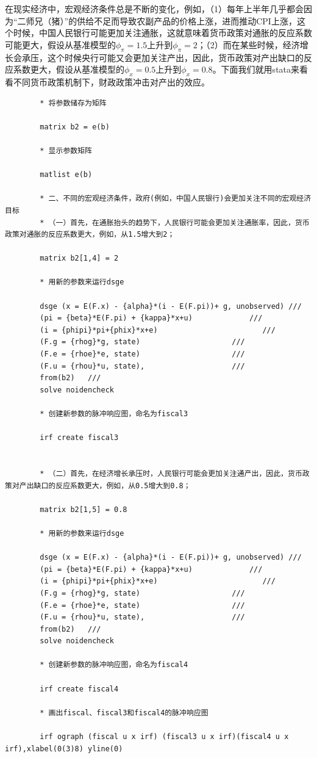 \documentclass[cn,12pt,math=newtx,citestyle=gb7714-2015,bibstyle=gb7714-2015]{elegantbook}
\begin{document}
	在现实经济中，宏观经济条件总是不断的变化，例如，（1）每年上半年几乎都会因为“二师兄（猪）”的供给不足而导致农副产品的价格上涨，进而推动CPI上涨，这个时候，中国人民银行可能更加关注通胀，这就意味着货币政策对通胀的反应系数可能更大，假设从基准模型的$\phi_\pi= 1.5$上升到$\phi_\pi= 2$；（2）而在某些时候，经济增长会承压，这个时候央行可能又会更加关注产出，因此，货币政策对产出缺口的反应系数更大，假设从基准模型的$\phi_x= 0.5$上升到$\phi_x= 0.8$。下面我们就用stata来看看不同货币政策机制下，财政政策冲击对产出的效应。
	
	\begin{lstlisting}
		* 将参数储存为矩阵
		
		matrix b2 = e(b)
		
		* 显示参数矩阵
		
		matlist e(b)
		
		* 二、不同的宏观经济条件，政府(例如，中国人民银行)会更加关注不同的宏观经济目标
		* （一）首先，在通胀抬头的趋势下，人民银行可能会更加关注通胀率，因此，货币政策对通胀的反应系数更大，例如，从1.5增大到2；
		
		matrix b2[1,4] = 2
		
		* 用新的参数来运行dsge
		
		dsge (x = E(F.x) - {alpha}*(i - E(F.pi))+ g, unobserved) ///
		(pi = {beta}*E(F.pi) + {kappa}*x+u)             ///
		(i = {phipi}*pi+{phix}*x+e)                        ///
		(F.g = {rhog}*g, state)                     ///
		(F.e = {rhoe}*e, state)                     ///
		(F.u = {rhou}*u, state),                    ///
		from(b2)   /// 
		solve noidencheck
		
		* 创建新参数的脉冲响应图，命名为fiscal3
		
		irf create fiscal3
		
		
		* （二）首先，在经济增长承压时，人民银行可能会更加关注通产出，因此，货币政策对产出缺口的反应系数更大，例如，从0.5增大到0.8；
		
		matrix b2[1,5] = 0.8
		
		* 用新的参数来运行dsge
		
		dsge (x = E(F.x) - {alpha}*(i - E(F.pi))+ g, unobserved) ///
		(pi = {beta}*E(F.pi) + {kappa}*x+u)             ///
		(i = {phipi}*pi+{phix}*x+e)                        ///
		(F.g = {rhog}*g, state)                     ///
		(F.e = {rhoe}*e, state)                     ///
		(F.u = {rhou}*u, state),                    ///
		from(b2)   /// 
		solve noidencheck
		
		* 创建新参数的脉冲响应图，命名为fiscal4
		
		irf create fiscal4
		
		* 画出fiscal、fiscal3和fiscal4的脉冲响应图
		
		irf ograph (fiscal u x irf) (fiscal3 u x irf)(fiscal4 u x irf),xlabel(0(3)8) yline(0)
		
		
		
	\end{lstlisting}
\end{document}
